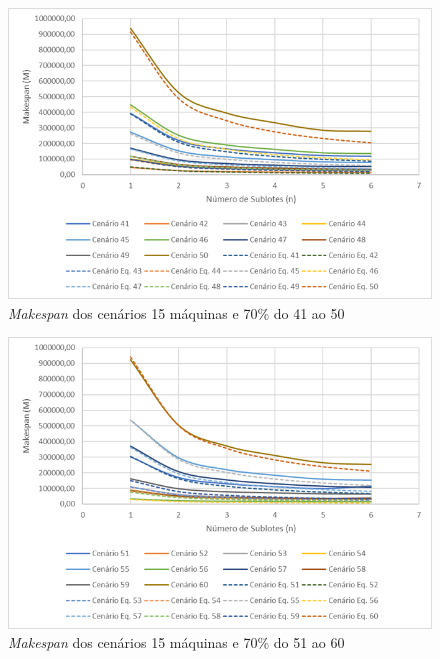 \begin{figure}[H]
    \centering
     \includegraphics[width=13cm]{Apendices/Figuras/15m70_41-50.png}
     \caption{\textit{Makespan} dos cenários 15 máquinas e 70\% do 41 ao 50}
    \label{fig:15m70_41-50}
\end{figure}

\begin{figure}[H]
    \centering
     \includegraphics[width=13cm]{Apendices/Figuras/15m70_51-60.png}
     \caption{\textit{Makespan} dos cenários 15 máquinas e 70\% do 51 ao 60}
    \label{fig:15m70_51-60}
\end{figure}

